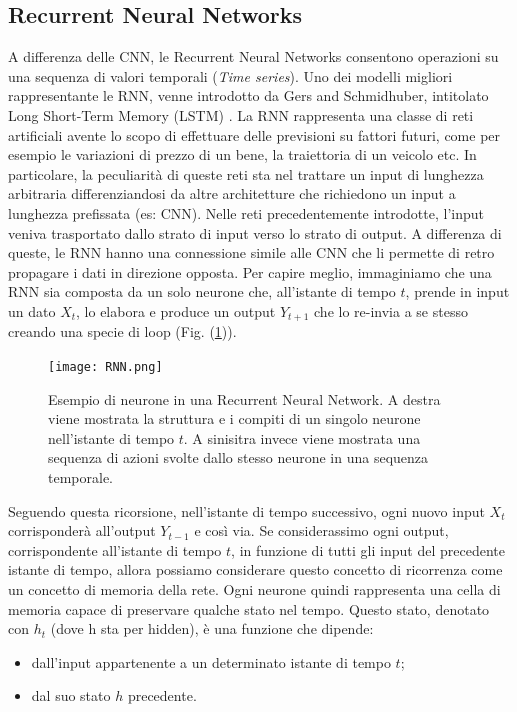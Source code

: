 \subsection{Recurrent Neural Networks}
A differenza delle CNN, le Recurrent Neural Networks consentono operazioni 
su una sequenza di valori temporali (\emph{Time series}). Uno dei modelli 
migliori rappresentante le RNN, venne introdotto da Gers and Schmidhuber, 
intitolato Long Short-Term Memory (LSTM) \cite{LSTM}. La RNN rappresenta 
una classe di reti artificiali avente lo scopo di effettuare delle previsioni 
su fattori futuri, come per esempio le variazioni di prezzo di un bene, la 
traiettoria di un veicolo etc. In particolare, la peculiarità di queste reti 
sta nel trattare un input di lunghezza arbitraria differenziandosi da altre 
architetture che richiedono un input a lunghezza prefissata (es: CNN). Nelle 
reti precedentemente introdotte, l'input veniva trasportato dallo strato di 
input verso lo strato di output. A differenza di queste, le RNN hanno una 
connessione simile alle CNN che li permette di retro propagare i dati in direzione 
opposta. Per capire meglio, immaginiamo che una RNN sia composta 
da un solo neurone che, all'istante di tempo $t$, prende in input un dato $X_t$, 
lo elabora e produce un output $Y_{t+1}$ che lo re-invia a se stesso creando una specie di loop (Fig. 
(\ref{neuron-rnn})).
\begin{figure}
    \centering
    \texttt{[image: RNN.png]}
    \centering
    \caption{Esempio di neurone in una Recurrent Neural Network. A destra viene mostrata la struttura e i compiti di un singolo neurone nell'istante di tempo $t$. A sinisitra invece viene mostrata una sequenza di azioni svolte dallo stesso neurone in una sequenza temporale.}
    \label{neuron-rnn}
\end{figure}
Seguendo questa ricorsione, nell'istante di tempo successivo, ogni nuovo input $X_t$ corrisponderà 
all'output $Y_{t-1}$ e così via.  Se considerassimo ogni output, corrispondente all'istante di 
tempo $t$, in funzione di tutti gli input del precedente istante di tempo, allora possiamo 
considerare questo concetto di ricorrenza come un concetto di memoria della rete. Ogni 
neurone quindi rappresenta una cella di memoria capace di preservare qualche stato nel 
tempo. Questo stato, denotato con $h_t$ (dove h sta per hidden), è una funzione che dipende:
\begin{itemize}
    \item dall'input appartenente a un determinato istante di tempo $t$;
    \item dal suo stato $h$ precedente.
\end{itemize}
